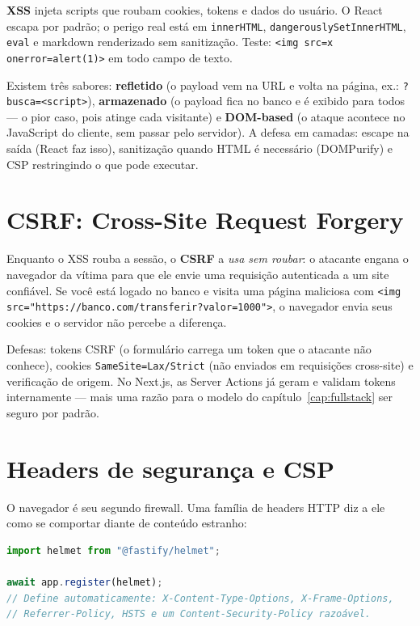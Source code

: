 \begin{caixaconceito}
\textbf{XSS} injeta scripts que roubam cookies, tokens e dados do usuário. O
React escapa por padrão; o perigo real está em \texttt{innerHTML},
\texttt{dangerouslySetInnerHTML}, \texttt{eval} e markdown renderizado sem
sanitização. Teste: \texttt{<img src=x onerror=alert(1)>} em todo campo de
texto.
\end{caixaconceito}

Existem três sabores: \textbf{refletido} (o payload vem na URL e volta na
página, ex.: \texttt{?busca=<script>}), \textbf{armazenado} (o payload fica no
banco e é exibido para todos — o pior caso, pois atinge cada visitante) e
\textbf{DOM-based} (o ataque acontece no JavaScript do cliente, sem passar
pelo servidor). A defesa em camadas: escape na saída (React faz isso),
sanitização quando HTML é necessário (DOMPurify) e CSP restringindo o que
pode executar.

\section{CSRF: Cross-Site Request Forgery}

Enquanto o XSS rouba a sessão, o \textbf{CSRF} a \emph{usa sem roubar}: o
atacante engana o navegador da vítima para que ele envie uma requisição
autenticada a um site confiável. Se você está logado no banco e visita uma
página maliciosa com \texttt{<img src="https://banco.com/transferir?valor=1000">},
o navegador envia seus cookies e o servidor não percebe a diferença.

Defesas: tokens CSRF (o formulário carrega um token que o atacante não
conhece), cookies \texttt{SameSite=Lax/Strict} (não enviados em requisições
cross-site) e verificação de origem. No Next.js, as Server Actions já geram e
validam tokens internamente — mais uma razão para o modelo do
capítulo~\ref{cap:fullstack} ser seguro por padrão.

\section{Headers de segurança e CSP}

O navegador é seu segundo firewall. Uma família de headers HTTP diz a ele
como se comportar diante de conteúdo estranho:

\begin{lstlisting}[style=livro, language=TypeScript,
  caption={Headers de segurança com helmet (Fastify/Express).},
  label={list:seg-headers}]
import helmet from "@fastify/helmet";

await app.register(helmet);
// Define automaticamente: X-Content-Type-Options, X-Frame-Options,
// Referrer-Policy, HSTS e um Content-Security-Policy razoável.
\end{lstlisting}

